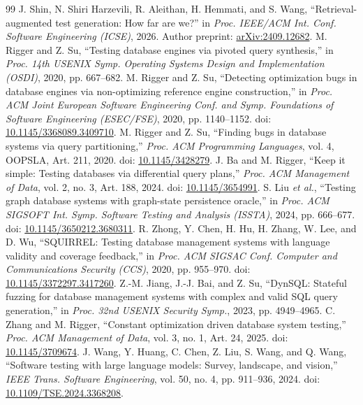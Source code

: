 \documentclass[acmsmall,screen,anonymous]{acmart}
\begin{document}
\begin{thebibliography}{99}
 J. Shin, N. Shiri Harzevili, R. Aleithan, H. Hemmati, and S. Wang, ``Retrieval-augmented test generation: How far are we?'' in \emph{Proc. IEEE/ACM Int. Conf. Software Engineering (ICSE)}, 2026. Author preprint: \href{https://arxiv.org/abs/2409.12682}{arXiv:2409.12682}.
 M. Rigger and Z. Su, ``Testing database engines via pivoted query synthesis,'' in \emph{Proc. 14th USENIX Symp. Operating Systems Design and Implementation (OSDI)}, 2020, pp. 667--682.
 M. Rigger and Z. Su, ``Detecting optimization bugs in database engines via non-optimizing reference engine construction,'' in \emph{Proc. ACM Joint European Software Engineering Conf. and Symp. Foundations of Software Engineering (ESEC/FSE)}, 2020, pp. 1140--1152. doi: \href{https://doi.org/10.1145/3368089.3409710}{10.1145/3368089.3409710}.
 M. Rigger and Z. Su, ``Finding bugs in database systems via query partitioning,'' \emph{Proc. ACM Programming Languages}, vol. 4, OOPSLA, Art. 211, 2020. doi: \href{https://doi.org/10.1145/3428279}{10.1145/3428279}.
 J. Ba and M. Rigger, ``Keep it simple: Testing databases via differential query plans,'' \emph{Proc. ACM Management of Data}, vol. 2, no. 3, Art. 188, 2024. doi: \href{https://doi.org/10.1145/3654991}{10.1145/3654991}.
 S. Liu \emph{et al.}, ``Testing graph database systems with graph-state persistence oracle,'' in \emph{Proc. ACM SIGSOFT Int. Symp. Software Testing and Analysis (ISSTA)}, 2024, pp. 666--677. doi: \href{https://doi.org/10.1145/3650212.3680311}{10.1145/3650212.3680311}.
 R. Zhong, Y. Chen, H. Hu, H. Zhang, W. Lee, and D. Wu, ``SQUIRREL: Testing database management systems with language validity and coverage feedback,'' in \emph{Proc. ACM SIGSAC Conf. Computer and Communications Security (CCS)}, 2020, pp. 955--970. doi: \href{https://doi.org/10.1145/3372297.3417260}{10.1145/3372297.3417260}.
 Z.-M. Jiang, J.-J. Bai, and Z. Su, ``DynSQL: Stateful fuzzing for database management systems with complex and valid SQL query generation,'' in \emph{Proc. 32nd USENIX Security Symp.}, 2023, pp. 4949--4965.
 C. Zhang and M. Rigger, ``Constant optimization driven database system testing,'' \emph{Proc. ACM Management of Data}, vol. 3, no. 1, Art. 24, 2025. doi: \href{https://doi.org/10.1145/3709674}{10.1145/3709674}.
 J. Wang, Y. Huang, C. Chen, Z. Liu, S. Wang, and Q. Wang, ``Software testing with large language models: Survey, landscape, and vision,'' \emph{IEEE Trans. Software Engineering}, vol. 50, no. 4, pp. 911--936, 2024. doi: \href{https://doi.org/10.1109/TSE.2024.3368208}{10.1109/TSE.2024.3368208}.

\end{thebibliography}
\end{document}
